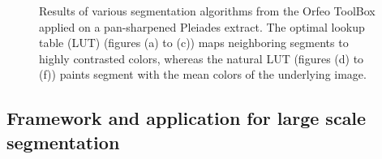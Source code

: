 \documentclass{josis}
\begin{document}
\begin{figure}[!htb]
\quad
{}
\quad
{}
\caption{Results of various segmentation algorithms from the Orfeo ToolBox
  applied on a pan-sharpened Pleiades extract. The optimal lookup table (LUT) (figures
  (a) to (c)) maps
  neighboring segments to highly contrasted colors, whereas the
  natural LUT (figures
  (d) to (f)) paints segment with the mean colors of the underlying image.}\label{fig:segalgs}
\end{figure}


\subsection{Framework and application for large scale segmentation}
\end{document}
